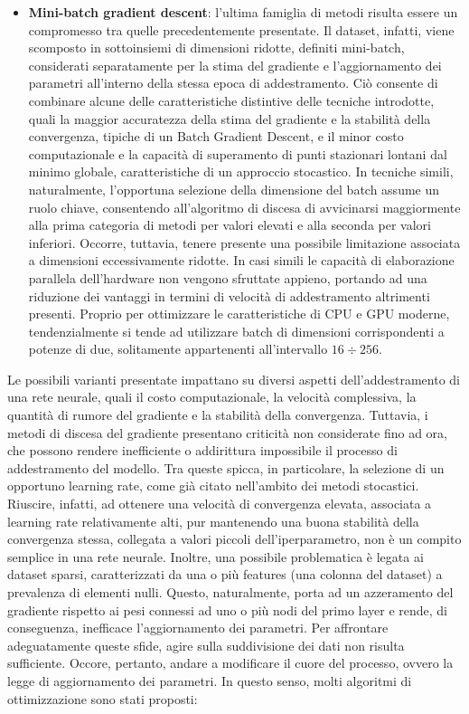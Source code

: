 \begin{itemize}
        \item \textbf{Mini-batch gradient descent}: l'ultima famiglia di metodi risulta essere un compromesso tra quelle precedentemente presentate. Il dataset, infatti, viene scomposto in sottoinsiemi di dimensioni ridotte, definiti mini-batch, considerati separatamente per la stima del gradiente e l'aggiornamento dei parametri all'interno della stessa epoca di addestramento. Ciò consente di combinare alcune delle caratteristiche distintive delle tecniche introdotte, quali la maggior accuratezza della stima del gradiente e la stabilità della convergenza, tipiche di un Batch Gradient Descent, e il minor costo computazionale e la capacità di superamento di punti stazionari lontani dal minimo globale, caratteristiche di un approccio stocastico. In tecniche simili, naturalmente, l'opportuna selezione della dimensione del batch assume un ruolo chiave, consentendo all'algoritmo di discesa di avvicinarsi maggiormente alla prima categoria di metodi per valori elevati e alla seconda per valori inferiori. Occorre, tuttavia, tenere presente una possibile limitazione associata a dimensioni eccessivamente ridotte. In casi simili le capacità di elaborazione parallela dell'hardware non vengono sfruttate appieno, portando ad una riduzione dei vantaggi in termini di velocità di addestramento altrimenti presenti. Proprio per ottimizzare le caratteristiche di CPU e GPU moderne, tendenzialmente si tende ad utilizzare batch di dimensioni corrispondenti a potenze di due, solitamente appartenenti all'intervallo $16\div256$.
        
    \end{itemize}

Le possibili varianti presentate impattano su diversi aspetti dell'addestramento di una rete neurale, quali il costo computazionale, la velocità complessiva, la quantità di rumore del gradiente e la stabilità della convergenza. Tuttavia, i metodi di discesa del gradiente presentano criticità non considerate fino ad ora, che possono rendere inefficiente o addirittura impossibile il processo di addestramento del modello. Tra queste spicca, in particolare, la selezione di un opportuno learning rate, come già citato nell'ambito dei metodi stocastici. Riuscire, infatti, ad ottenere una velocità di convergenza elevata, associata a learning rate relativamente alti, pur mantenendo una buona stabilità della convergenza stessa, collegata a valori piccoli dell'iperparametro, non è un compito semplice in una rete neurale. Inoltre, una possibile problematica è legata ai dataset sparsi, caratterizzati da una o più features (una colonna del dataset) a prevalenza di elementi nulli. Questo, naturalmente, porta ad un azzeramento del gradiente rispetto ai pesi connessi ad uno o più nodi del primo layer e rende, di conseguenza, inefficace l'aggiornamento dei parametri. Per affrontare adeguatamente queste sfide, agire sulla suddivisione dei dati non risulta sufficiente. Occore, pertanto, andare a modificare il cuore del processo, ovvero la legge di aggiornamento dei parametri. In questo senso, molti algoritmi di ottimizzazione sono stati proposti: 

